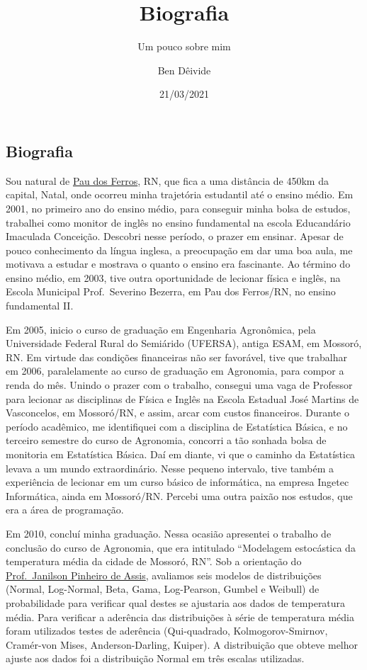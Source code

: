 \documentclass[
]{article}
\title{Biografia}
\subtitle{Um pouco sobre mim}
\author{Ben Dêivide}
\date{21/03/2021}
\begin{document}
\maketitle

\hypertarget{biografia}{%
\subsection{Biografia}\label{biografia}}

Sou natural de \href{http://pt.wikipedia.org/wiki/Pau_dos_Ferros}{Pau
dos Ferros}, RN, que fica a uma distância de 450km da capital, Natal,
onde ocorreu minha trajetória estudantil até o ensino médio. Em 2001, no
primeiro ano do ensino médio, para conseguir minha bolsa de estudos,
trabalhei como monitor de inglês no ensino fundamental na escola
Educandário Imaculada Conceição. Descobri nesse período, o prazer em
ensinar. Apesar de pouco conhecimento da língua inglesa, a preocupação
em dar uma boa aula, me motivava a estudar e mostrava o quanto o ensino
era fascinante. Ao término do ensino médio, em 2003, tive outra
oportunidade de lecionar física e inglês, na Escola Municipal
Prof.~Severino Bezerra, em Pau dos Ferros/RN, no ensino fundamental II.

Em 2005, inicio o curso de graduação em Engenharia Agronômica, pela
Universidade Federal Rural do Semiárido (UFERSA), antiga ESAM, em
Mossoró, RN. Em virtude das condições financeiras não ser favorável,
tive que trabalhar em 2006, paralelamente ao curso de graduação em
Agronomia, para compor a renda do mês. Unindo o prazer com o trabalho,
consegui uma vaga de Professor para lecionar as disciplinas de Física e
Inglês na Escola Estadual José Martins de Vasconcelos, em Mossoró/RN, e
assim, arcar com custos financeiros. Durante o período acadêmico, me
identifiquei com a disciplina de Estatística Básica, e no terceiro
semestre do curso de Agronomia, concorri a tão sonhada bolsa de
monitoria em Estatística Básica. Daí em diante, vi que o caminho da
Estatística levava a um mundo extraordinário. Nesse pequeno intervalo,
tive também a experiência de lecionar em um curso básico de informática,
na empresa Ingetec Informática, ainda em Mossoró/RN. Percebi uma outra
paixão nos estudos, que era a área de programação.

Em 2010, concluí minha graduação. Nessa ocasião apresentei o trabalho de
conclusão do curso de Agronomia, que era intitulado ``Modelagem
estocástica da temperatura média da cidade de Mossoró, RN''. Sob a
orientação do
\href{https://sigaa.ufersa.edu.br/sigaa/public/docente/portal.jsf?siape=396304}{Prof.~Janilson
Pinheiro de Assis}, avaliamos seis modelos de distribuições (Normal,
Log-Normal, Beta, Gama, Log-Pearson, Gumbel e Weibull) de probabilidade
para verificar qual destes se ajustaria aos dados de temperatura média.
Para verificar a aderência das distribuições à série de temperatura
média foram utilizados testes de aderência (Qui-quadrado,
Kolmogorov-Smirnov, Cramér-von Mises, Anderson-Darling, Kuiper). A
distribuição que obteve melhor ajuste aos dados foi a distribuição
Normal em três escalas utilizadas.
\end{document}
